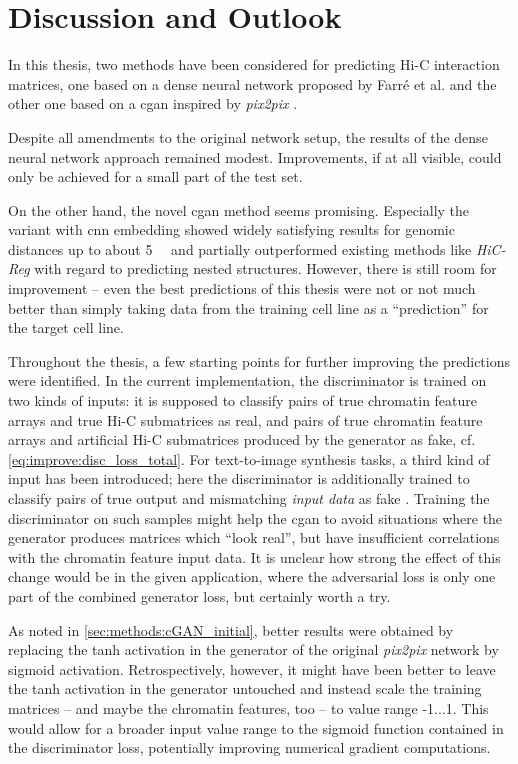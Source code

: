 \section{Discussion and Outlook}
In this thesis, two methods have been considered for predicting Hi-C interaction matrices,
one based on a dense neural network proposed by Farr\'e et al. \cite{Farre2018a} and the other one based on a \acrlong{cgan}
inspired by \emph{pix2pix} \cite{Isola2017}.

Despite all amendments to the original network setup,
the results of the dense neural network approach remained modest.
Improvements, if at all visible, could only be achieved for a small part of the test set.

On the other hand, the novel \acrfull{cgan} method seems promising.
Especially the variant with \acrshort{cnn} embedding showed widely satisfying results for genomic distances up to about \SI{5}{\mega\bp}
and partially outperformed existing methods like \emph{HiC-Reg} \cite{Zhang2019} with regard to predicting nested structures.
However, there is still room for improvement -- even the best predictions of this thesis were not or not much better 
than simply taking data from the training cell line as a ``prediction'' for the target cell line.

Throughout the thesis, a few starting points for further improving the predictions were identified.
In the current implementation, the discriminator is trained on two kinds of inputs:
it is supposed to classify pairs of true chromatin feature arrays and true Hi-C submatrices as real, 
and pairs of true chromatin feature arrays and artificial Hi-C submatrices produced by the generator as fake, cf. \cref{eq:improve:disc_loss_total}.
For text-to-image synthesis tasks, a third kind of input has been introduced; here the discriminator is additionally trained 
to classify pairs of true output and mismatching \emph{input data} as fake \cite{Reed2016}.
Training the discriminator on such samples might help the \acrshort{cgan} to avoid situations 
where the generator produces matrices which ``look real'', 
but have insufficient correlations with the chromatin feature input data.
It is unclear how strong the effect of this change would be in the given application, 
where the adversarial loss is only one part of the combined generator loss, but certainly worth a try.

As noted in \cref{sec:methods:cGAN_initial}, better results were obtained by replacing the tanh activation in the generator 
of the original \emph{pix2pix} network by sigmoid activation.
Retrospectively, however, it might have been better to leave the tanh activation in the generator untouched
and instead scale the training matrices -- and maybe the chromatin features, too -- to value range -1...1.
This would allow for a broader input value range to the sigmoid function contained in the discriminator loss,
potentially improving numerical gradient computations.

